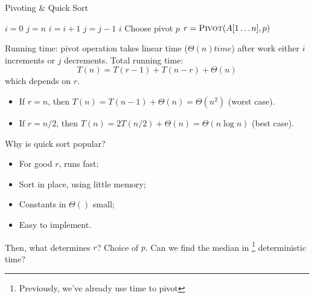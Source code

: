 \begin{algorithm}[H]
    \caption{Pivoting \& Quick Sort}\label{algo:qs}
    \begin{algorithmic}[1]
            \State{}
            \State $i = 0$
            \State $j = n$
                \Repeat
                    \State $i = i+1$
                \Repeat
                    \State $j = j-1$
                    \State{}
                \EndIf
            \EndWhile
            \State{}
            \Return $i$
        \EndProcedure
                \State Choose pivot $p$
                \State $r = \textsc{Pivot} (A[1 \ldots n], p)$
                \State {}
                \State {}
            \EndIf
        \EndProcedure
    \end{algorithmic}
\end{algorithm}

\analysis
Running time: pivot operation takes linear time ($\Theta(n) time$)
after  work either $i$ increments or $j$ decrements.
Total running time:
\[T(n) = T(r - 1) + T(n - r) + \Theta(n)\]
which depends on $r$.
\begin{itemize}
    \item If $r = n$, then $T(n) = T(n-1) + \Theta(n) = \Theta(n^2)$ (worst case).
    \item If $r = n/2$, then $T(n) = 2T(n/2) + \Theta(n) = \Theta(n\log n)$ (best case).
\end{itemize}

Why is quick sort popular?
\begin{itemize}
    \item For good $r$, runs fast;
    \item Sort in place, using little memory;
    \item Constants in $\Theta(  )$ small;
    \item Easy to implement.
\end{itemize}

Then, what determines $r$? Choice of $p$.
Can we find the median in 
\footnote{Previously, we've already use  time to pivot}
deterministic time?

